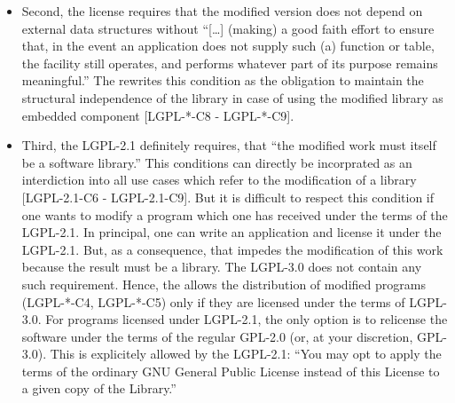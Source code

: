 \begin{itemize}
\begin{itemize}
  \item Second, the license requires that the modified version does not depend
    on external data structures without \enquote{[\ldots] (making) a good faith
    effort to ensure that, in the event an application does not supply such (a)
    function or table, the facility still operates, and performs whatever part
    of its purpose remains meaningful.} The \oslic{}
    rewrites this condition as the obligation to maintain the structural
    independence of the library in case of using the modified library as
    embedded component [LGPL-*-C8 - LGPL-*-C9]. 
    
  \item \label{para:libislib}Third, the LGPL-2.1 definitely requires, that
    \enquote{the modified work must itself be a software
    library.}  This conditions can directly be incorprated as an
    interdiction into all use cases which refer to the modification of a library
    [LGPL-2.1-C6 - LGPL-2.1-C9]. But it is difficult to respect this condition
    if one wants to modify a program which one has received under the terms of
    the LGPL-2.1. In principal, one can write an application and license it
    under the LGPL-2.1. But, as a consequence, that impedes the modification of
    this work because the result must be a library. 
    The LGPL-3.0 does not contain any such requirement. Hence, the \oslic{} allows
    the distribution of modified programs (LGPL-*-C4, LGPL-*-C5) only if they
    are licensed under the terms of LGPL-3.0. For programs licensed under
    LGPL-2.1, the only option is to relicense the software under the terms of
    the regular GPL-2.0 (or, at your discretion, GPL-3.0).  This is explicitely
    allowed by the LGPL-2.1: \enquote{You may opt to apply the terms of the
    ordinary GNU General Public License instead of this License to a given
    copy of the Library.} 
  \end{itemize}
  

\end{itemize}
